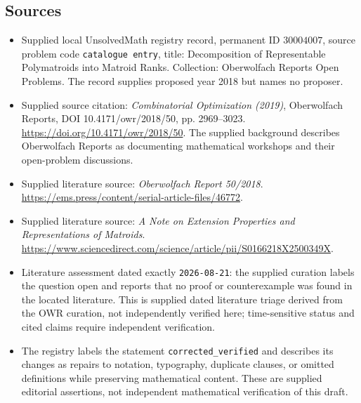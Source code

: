 \documentclass[11pt]{article}
\begin{document}
\subsection{Sources}
\begin{itemize}
\item Supplied local UnsolvedMath registry record, permanent ID \(30004007\), source problem code \texttt{catalogue entry}, title: Decomposition of Representable Polymatroids into Matroid Ranks. Collection: Oberwolfach Reports Open Problems. The record supplies proposed year 2018 but names no proposer.
\item Supplied source citation: \emph{Combinatorial Optimization (2019)}, Oberwolfach Reports, DOI 10.4171/owr/2018/50, pp. 2969--3023. \url{https://doi.org/10.4171/owr/2018/50}. The supplied background describes Oberwolfach Reports as documenting mathematical workshops and their open-problem discussions.
\item Supplied literature source: \emph{Oberwolfach Report 50/2018}. \url{https://ems.press/content/serial-article-files/46772}.
\item Supplied literature source: \emph{A Note on Extension Properties and Representations of Matroids}. \url{https://www.sciencedirect.com/science/article/pii/S0166218X2500349X}.
\item Literature assessment dated exactly \texttt{2026-08-21}: the supplied curation labels the question open and reports that no proof or counterexample was found in the located literature. This is supplied dated literature triage derived from the OWR curation, not independently verified here; time-sensitive status and cited claims require independent verification.
\item The registry labels the statement \texttt{corrected\_verified} and describes its changes as repairs to notation, typography, duplicate clauses, or omitted definitions while preserving mathematical content. These are supplied editorial assertions, not independent mathematical verification of this draft.
\end{itemize}
\end{document}
